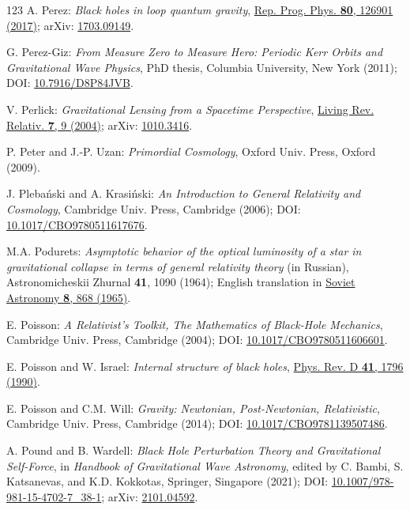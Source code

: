 \begin{thebibliography}{123}
A. Perez:
{\em Black holes in loop quantum gravity},
\href{https://doi.org/10.1088/1361-6633/aa7e14}{Rep. Prog. Phys. {\bf 80}, 126901 (2017)};
arXiv: \href{https://arxiv.org/abs/1703.09149}{1703.09149}.

G. Perez-Giz: {\em From Measure Zero to Measure Hero:
Periodic Kerr Orbits and Gravitational Wave Physics},
PhD thesis, Columbia University, New York (2011);
DOI: \href{https://doi.org/10.7916/D8P84JVB}{10.7916/D8P84JVB}.

V. Perlick:
{\em Gravitational Lensing from a Spacetime Perspective},
\href{https://doi.org/10.12942/lrr-2004-9}{Living Rev. Relativ. {\bf 7}, 9 (2004)};
arXiv: \href{https://arxiv.org/abs/1010.3416}{1010.3416}.

P. Peter and J.-P. Uzan: {\em Primordial Cosmology},
Oxford Univ. Press, Oxford (2009).

J. Pleba\'nski and A. Krasi\'nski:
{\em An Introduction to General Relativity and Cosmology},
Cambridge Univ. Press, Cambridge (2006);
DOI: \href{https://doi.org/10.1017/CBO9780511617676}{10.1017/CBO9780511617676}.

M.A. Podurets:
{\em Asymptotic behavior of the optical luminosity of a star in gravitational collapse
in terms of general relativity theory}
(in Russian),
Astronomicheskii Zhurnal {\bf 41}, 1090 (1964);
English translation in \href{https://ui.adsabs.harvard.edu/abs/1965SvA.....8..868P/abstract}{Soviet Astronomy {\bf 8}, 868 (1965)}.

E. Poisson: \emph{A Relativist's Toolkit,
The Mathematics of Black-Hole Mechanics},
Cambridge Univ. Press, Cambridge (2004);
DOI: \href{https://doi.org/10.1017/CBO9780511606601}{10.1017/CBO9780511606601}.

E. Poisson and W. Israel: {\em Internal structure of black holes},
\href{https://doi.org/10.1103/PhysRevD.41.1796}{Phys. Rev. D {\bf 41}, 1796 (1990)}.

E. Poisson and C.M. Will: {\em Gravity: Newtonian, Post-Newtonian, Relativistic},
Cambridge Univ. Press, Cambridge (2014);
DOI: \href{https://doi.org/10.1017/CBO9781139507486}{10.1017/CBO9781139507486}.

A. Pound and B. Wardell:
{\em Black Hole Perturbation Theory and Gravitational Self-Force},
in {\em Handbook of Gravitational Wave Astronomy}, edited by
C. Bambi, S. Katsanevas, and K.D. Kokkotas,
Springer, Singapore (2021);
DOI: \href{https://doi.org/10.1007/978-981-15-4702-7_38-1}{10.1007/978-981-15-4702-7\_38-1};
arXiv: \href{https://arxiv.org/abs/2101.04592}{2101.04592}.


\end{thebibliography}
